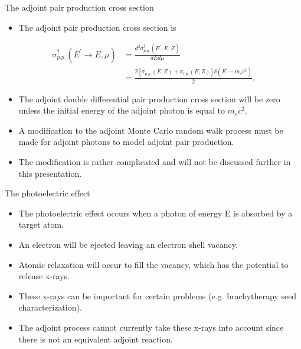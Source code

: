 \documentclass{beamer}
\begin{document}
\begin{frame}{The adjoint pair production cross section}

  \begin{itemize}
    \item The adjoint pair production cross section is
  \end{itemize}
  \begin{align}
    \sigma_{p.p.}^{\dagger}(E^{'} \to E,\mu) & = 
    \frac{d^2\sigma_{p.p.}^{\dagger}(E^{'},E,Z)}{dEd\mu} \nonumber \\
    & = \frac{2\left[\sigma_{p.p.}(E,Z)+\sigma_{t.p.}(E,Z)\right]
      \delta(E^{'}-m_ec^2)}{2}. \nonumber
  \end{align}

  \begin{itemize}
    \item The adjoint double differential pair production cross section will be
      zero unless the initial energy of the adjoint photon is equal to $m_ec^2$.
    \item A modification to the adjoint Monte Carlo random walk process must
      be made for adjoint photons to model adjoint pair production.
    \item The modification is rather complicated and will not be discussed
      further in this presentation. 
  \end{itemize}

\end{frame}  

\begin{frame}{The photoelectric effect}

  \begin{itemize}
    \item The photoelectric effect occurs when a photon of energy E is absorbed
      by a target atom.
    \item An electron will be ejected leaving an electron shell vacancy.
    \item Atomic relaxation will occur to fill the vacancy, which has the
      potential to release x-rays.
    \item These x-rays can be important for certain problems (e.g. brachytherapy
      seed characterization).
    \item The adjoint process cannot currently take these x-rays into account
      since there is not an equivalent adjoint reaction.
  \end{itemize}

\end{frame}
\end{document}
